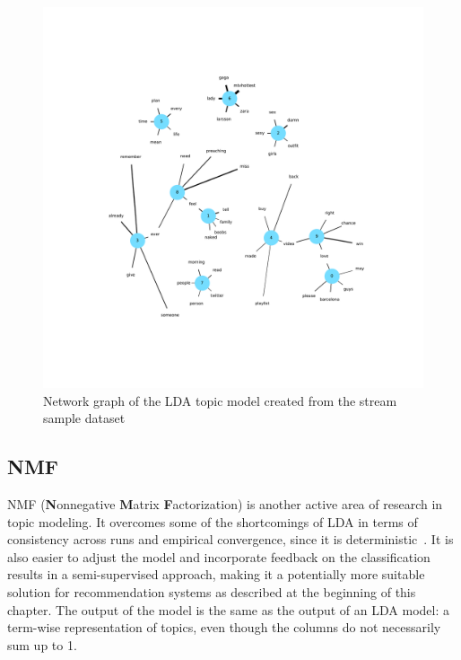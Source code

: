 \begin{figure}
    \centering
    \caption{Network graph of the LDA topic model created from the stream sample dataset}
    \label{fig:lda_network_graph}
    \includegraphics[width=\textwidth]{../figures/lda_network_graph.pdf}
\end{figure}


\subsection{NMF}
\label{subsec:nmf}

NMF (\textbf{N}onnegative \textbf{M}atrix \textbf{F}actorization) is another active area of research in topic modeling.
It overcomes some of the shortcomings of LDA in terms of consistency across runs and empirical convergence,
since it is deterministic~\cite{Choo2013}.
It is also easier to adjust the model and incorporate feedback on the classification results in a semi-supervised approach,
making it a potentially more suitable solution for recommendation systems as described at the beginning of this chapter.
The output of the model is the same as the output of an LDA model: a term-wise representation of topics, even though the columns
do not necessarily sum up to 1.


